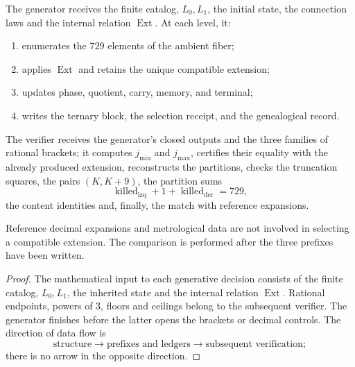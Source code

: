 \begin{definition}
The generator receives the finite catalog, \(L_0,L_1\), the initial state, the
connection laws and the internal relation \(\operatorname{Ext}\). At each level, it:
\begin{enumerate}
 \item enumerates the \(729\) elements of the ambient fiber;
 \item applies \(\operatorname{Ext}\) and retains the unique compatible extension;
 \item updates phase, quotient, carry, memory, and terminal;
 \item writes the ternary block, the selection receipt, and the genealogical record.
\end{enumerate}
\end{definition}

\begin{definition}
The verifier receives the generator’s closed outputs and the three families
of rational brackets; it computes \(j_{\min}\) and \(j_{\max}\), certifies their
equality with the already produced extension, reconstructs the
partitions, checks the truncation squares, the pairs
\((K,K+9)\), the partition sums
\[
 \operatorname{killed}_{\mathrm{izq}}+1+\operatorname{killed}_{\mathrm{der}}=729,
\]
the content identities and, finally, the match with reference expansions.
\end{definition}

\begin{theorem}
\label{gfp:b:thm:aislamiento-datos-objetivo-precision}
Reference decimal expansions and metrological data are not
involved in selecting a compatible extension. The comparison is
performed after the three prefixes have been written.
\end{theorem}

\begin{proof}
The mathematical input to each generative decision consists of the finite
catalog, \(L_0,L_1\), the inherited state and the internal relation
\(\operatorname{Ext}\). Rational endpoints, powers of \(3\), floors and
ceilings belong to the subsequent verifier. The generator finishes before
the latter opens the brackets or decimal controls. The direction of data
flow is
\[
 \text{structure}\longrightarrow
 \text{prefixes and ledgers}\longrightarrow
 \text{subsequent verification};
\]
there is no arrow in the opposite direction.
\end{proof}

